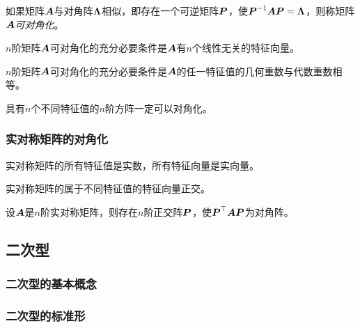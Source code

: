 \documentclass{ctexart}
\begin{document}
\begin{definition}[可对角化]
    如果矩阵\(\boldsymbol{A}\)与对角阵\(\boldsymbol{\Lambda}\)相似，即存在一个可逆矩阵\(\boldsymbol{P}\)，使\({\boldsymbol{P}}^{-1}\boldsymbol{A}\boldsymbol{P}=\boldsymbol{\Lambda}\)，则称矩阵\(\boldsymbol{A}\)\emph{可对角化}。
\end{definition}

\begin{theorem}
    \(n\)阶矩阵\(\boldsymbol{A}\)可对角化的充分必要条件是\(\boldsymbol{A}\)有\(n\)个线性无关的特征向量。
\end{theorem}

\begin{theorem}
    \(n\)阶矩阵\(\boldsymbol{A}\)可对角化的充分必要条件是\(\boldsymbol{A}\)的任一特征值的几何重数与代数重数相等。
\end{theorem}

\begin{infer}
    具有\(n\)个不同特征值的\(n\)阶方阵一定可以对角化。
\end{infer}

\subsubsection*{实对称矩阵的对角化}

\begin{theorem}
    实对称矩阵的所有特征值是实数，所有特征向量是实向量。
\end{theorem}

\begin{theorem}
    实对称矩阵的属于不同特征值的特征向量正交。
\end{theorem}

\begin{theorem}
    设\(\boldsymbol{A}\)是\(n\)阶实对称矩阵，则存在\(n\)阶正交阵\(\boldsymbol{P}\)，使\(\boldsymbol{P}^\top\boldsymbol{A}\boldsymbol{P}\)为对角阵。
\end{theorem}

\subsection{二次型}

\subsubsection*{二次型的基本概念}

\subsubsection*{二次型的标准形}
\end{document}
